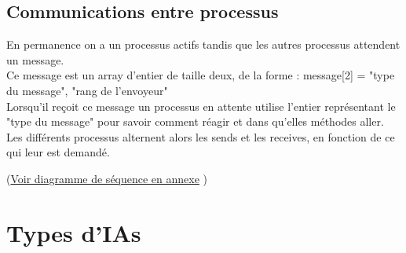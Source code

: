 \documentclass[a4paper,10pt]{article}
\begin{document}
	
	
	\subsection{Communications entre processus}
		En permanence on a un processus actifs tandis que les autres processus attendent un message.\\
		Ce message est un array d'entier de taille deux, de la forme : message[2] = {"type du message", "rang de l'envoyeur"}\\
		Lorsqu'il reçoit ce message un processus en attente utilise l'entier représentant le "type du message" pour savoir comment réagir et dans qu'elles méthodes aller.\\
		Les différents processus alternent alors les sends et les receives, en fonction de ce qui leur est demandé.
		
	(\hyperlink{seqDiag}{Voir diagramme de séquence en annexe} )
	
		
		
		
\section{Types d'IAs}
\end{document}
